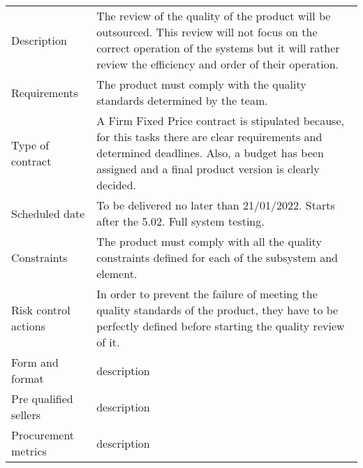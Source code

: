 \begin{table}[H]
	\centering
	\begin{tabular}
		{>{\raggedright\arraybackslash}p{3cm} >{\arraybackslash}p{11cm}}
		
		\toprule[2pt]
		
		\multicolumn{2}{c}{\textbf{SOW - 5.6. Quality of the product}}\\
		
		\midrule[1.5pt]
		
		Description & The review of the quality of the product will be outsourced. This review will not focus on the correct operation of the systems but it will rather review the efficiency and order of their operation. \\
		\hline
		
		Requirements & The product must comply with the quality standards determined by the team.\\
		\hline
		
		Type of contract & A Firm Fixed Price contract is stipulated because, for this tasks there are clear requirements and determined deadlines. Also, a budget has been assigned and a final product version is clearly decided.\\
		\hline
		
		Scheduled date & To be delivered no later than 21/01/2022. Starts after the 5.02. Full system testing.\\
		\hline
		
		Constraints & The product must comply with all the quality constraints defined for each of the subsystem and element.\\
		\hline
		
		Risk control actions & In order to prevent the failure of meeting the quality standards of the product, they have to be perfectly defined before starting the quality review of it.\\
		\hline
		
		Form and format & description\\
		\hline
		
		Pre qualified sellers & description\\
		\hline
		
		Procurement metrics & description\\
		
		\bottomrule[2pt]		
		
	\end{tabular}
\end{table}


